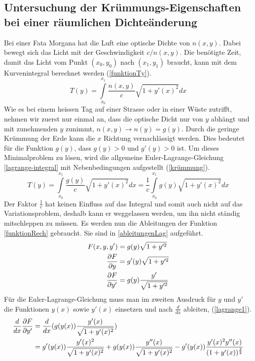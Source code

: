 \subsection{Untersuchung der Krümmungs-Eigenschaften bei einer räumlichen Dichteänderung \label{sec:Krümmung}}
Bei einer Fata Morgana hat die Luft eine optische Dichte von $n(x,y)$. 
Dabei bewegt sich das Licht mit der Geschwindigkeit $c/n(x,y)$. 
Die benötigte Zeit, damit das Licht vom Punkt $(x_0, y_0)$ nach $(x_1, y_1)$ braucht,
kann mit dem Kurvenintegral berechnet werden (\eqref{funktionTy}).
\begin{equation}
	T(y) = \int \limits_{x_0}^{x_1} \frac{n(x,y)}{c} \sqrt{1 + y'(x)^2} dx
	\label{funktionTy}
\end{equation}
Wie es bei einem heissen Tag auf einer Strasse oder in einer Wüste zutrifft,
nehmen wir zuerst nur einmal an, dass die optische Dicht nur von $y$ abhängt und mit zunehmenden $y$ zunimmt,
$n(x,y) \rightarrow n(y)=g(y)$.
Durch die geringe Krümmung der Erde kann die $x$ Richtung vernachlässigt werden.
Dies bedeutet für die Funktion $g(y)$, dass $g(y) > 0$ und $g'(y) > 0 $ ist.
Um dieses Minimalproblem zu lösen, wird die allgemeine Euler-Lagrange-Gleichung  \eqref{lagrange-integral} mit Nebenbedingungen aufgestellt (\eqref{krümmung}).
\begin{equation}
	T(y) = \int \limits_{x_0}^{x_1} \frac{g(y)}{c} \sqrt{1 + y'(x)^2} dx = \frac{1}{c} \int \limits_{x_0}^{x_1} g(y) \sqrt{1 + y'(x)^2} dx
	\label{krümmung}
\end{equation}
Der Faktor $\frac{1}{c}$ hat keinen Einfluss auf das Integral und somit auch nicht auf das Variationsproblem, deshalb kann er weggelassen werden, um ihn nicht ständig mitschleppen zu müssen.
Es werden nun die Ableitungen der Funktion \ref{funktionRech} gebraucht. Sie sind in \ref{ableitungenLag} aufgeführt.
\begin{align}
	F(x,y,y') &= g(y) \sqrt{1 + y'^2} \label{funktionRech} \\
	\frac{\partial F}{\partial y} &= g'(y) \sqrt{1 + y'^2} \notag \\
	\frac{\partial F}{\partial y'} &= g(y) \frac{y'}{\sqrt{1 + y'^2}} \label{ableitungenLag}
\end{align}
Für die Euler-Lagrange-Gleichung muss man im zweiten Ausdruck für $y$ und $y'$ die Funktionen $y(x)$ 
sowie $y'(x)$ einsetzen und nach $\frac{d}{dx}$ ableiten, (\eqref{lagrange1}).
\begin{align}
	\frac{d}{dx} \frac{\partial F}{\partial y'} &= \frac{d}{dx} (g(y(x)) \frac{y'(x)}{\sqrt{1 + y'(x)^2}}) \notag \\ 
	&= g'(y(x)) \frac{y'(x)^2}{\sqrt{1 + y'(x)^2}} + g(y(x)) \frac{y''(x)}{\sqrt{1 + y'(x)^2}}
	 - g'(y(x)) \frac{y'(x)^2 y''(x)}{(1 + y'(x))^\frac{3}{2}} 
	 \label{lagrange1}
\end{align}
